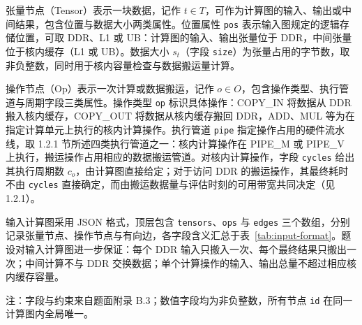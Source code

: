 张量节点（Tensor）表示一块数据，记作 $t\in T$，可作为计算图的输入、输出或中间结果，包含位置与数据大小两类属性。位置属性 \texttt{pos} 表示输入图规定的逻辑存储位置，可取 DDR、L1 或 UB：计算图的输入、输出张量位于 DDR，中间张量位于核内缓存（L1 或 UB）。数据大小 $s_t$（字段 \texttt{size}）为张量占用的字节数，取非负整数，同时用于核内容量检查与数据搬运量计算。

操作节点（Op）表示一次计算或数据搬运，记作 $o\in O$，包含操作类型、执行管道与周期字段三类属性。操作类型 \texttt{op} 标识具体操作：COPY\_IN 将数据从 DDR 搬入核内缓存，COPY\_OUT 将数据从核内缓存搬回 DDR，ADD、MUL 等为在指定计算单元上执行的核内计算操作。执行管道 \texttt{pipe} 指定操作占用的硬件流水线，取 1.2.1 节所述四类执行管道之一：核内计算操作在 PIPE\_M 或 PIPE\_V 上执行，搬运操作占用相应的数据搬运管道。对核内计算操作，字段 \texttt{cycles} 给出其执行周期数 $c_o$，由计算图直接给定；对于访问 DDR 的搬运操作，其最终耗时不由 \texttt{cycles} 直接确定，而由搬运数据量与评估时刻的可用带宽共同决定（见 1.2.1）。

输入计算图采用 JSON 格式，顶层包含 \texttt{tensors}、\texttt{ops} 与 \texttt{edges} 三个数组，分别记录张量节点、操作节点与有向边，各字段含义汇总于表~\ref{tab:input-format}。题设对输入计算图进一步保证：每个 DDR 输入只搬入一次、每个最终结果只搬出一次；中间计算不与 DDR 交换数据；单个计算操作的输入、输出总量不超过相应核内缓存容量。

\begin{table}[htbp]
  \centering
  \caption{输入计算图 JSON 字段说明}
  \label{tab:input-format}
  \begin{minipage}{0.9\linewidth}
    \small 注：字段与约束来自题面附录 B.3；数值字段均为非负整数，所有节点 \texttt{id} 在同一计算图内全局唯一。
  \end{minipage}
\end{table}

